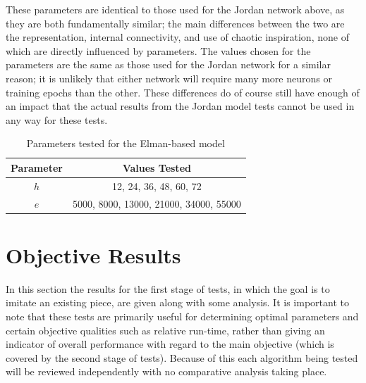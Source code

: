 \documentclass[ author={Stephen Livermore-Tozer},
				supervisor={Dr. Peter Flach},
				degree={MEng},
				title={Algorithmic Co-composition Using Machine Learning},
				subtitle={},
				type={research},
				year={2016} ]{dissertation}
\begin{document}
	These parameters are identical to those used for the Jordan network above, as they are both fundamentally similar; the main differences between the two are the representation, internal connectivity, and use of chaotic inspiration, none of which are directly influenced by parameters. The values chosen for the parameters are the same as those used for the Jordan network for a similar reason; it is unlikely that either network will require many more neurons or training epochs than the other. These differences do of course still have enough of an impact that the actual results from the Jordan model tests cannot be used in any way for these tests.
	
	\begin{table}[h]
		\begin{center}
			\begin{tabular}{cc}
				\toprule
				Parameter & Values Tested\\
				\hline
				$h$ & 12, 24, 36, 48, 60, 72\\
				$e$ & 5000, 8000, 13000, 21000, 34000, 55000\\
				\bottomrule
			\end{tabular}
		\end{center}
		\caption{Parameters tested for the Elman-based model}
		\label{tab:elman-parameters}
	\end{table}
	
	\section{Objective Results}

	In this section the results for the first stage of tests, in which the goal is to imitate an existing piece, are given along with some analysis. It is important to note that these tests are primarily useful for determining optimal parameters and certain objective qualities such as relative run-time, rather than giving an indicator of overall performance with regard to the main objective (which is covered by the second stage of tests). Because of this each algorithm being tested will be reviewed independently with no comparative analysis taking place.
	
\end{document}
